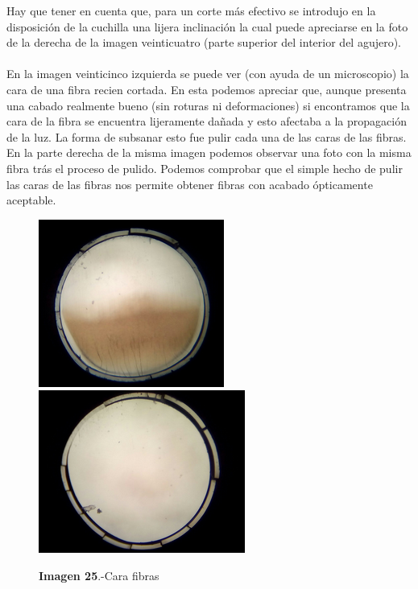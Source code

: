\documentclass[11pt, a4paper]{article}
\begin{document}
\newpage
Hay que tener en cuenta que, para un corte más efectivo se introdujo en la disposición de la cuchilla una lijera inclinación la cual puede apreciarse en la foto de la derecha de la imagen veinticuatro (parte superior del interior del agujero). 

\paragraph {}
En la imagen veinticinco izquierda se puede ver (con ayuda de un microscopio) la cara de una fibra recien cortada. En esta podemos apreciar que, aunque presenta una cabado realmente bueno (sin roturas ni deformaciones) si encontramos que la cara de la fibra se encuentra lijeramente dañada y esto afectaba a la propagación de la luz. La forma de subsanar esto fue pulir cada una de las caras de las fibras. En la parte derecha de la misma imagen podemos observar una foto con la misma fibra trás el proceso de pulido. Podemos comprobar que el simple hecho de pulir las caras de las fibras nos permite obtener fibras con acabado ópticamente aceptable.

\begin{figure}[htb]
\centering
{
\includegraphics[scale=0.3]{SinPulir.png} 
}
{
\includegraphics[scale=0.3]{Pulida.png} 
}
\caption{\textbf{Imagen 25}.-Cara fibras}
\end{figure} 
\end{document}

